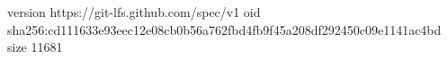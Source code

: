 version https://git-lfs.github.com/spec/v1
oid sha256:cd111633e93eec12e08cb0b56a762fbd4fb9f45a208df292450c09e1141ac4bd
size 11681
